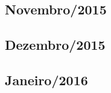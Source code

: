 \documentclass[12pt,a4paper]{article}
\begin{document}
\subsection{Novembro/2015}
  
   

\subsection{Dezembro/2015}
  
      

\subsection{Janeiro/2016} 
  
      

\end{document}
